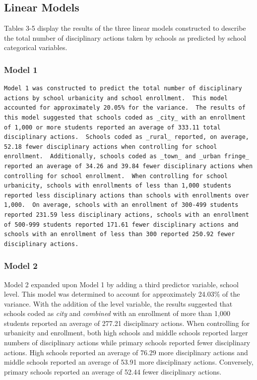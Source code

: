 \documentclass[man]{apa6}
\begin{document}
\hypertarget{linear-models-1}{%
\subsection{Linear Models}\label{linear-models-1}}

Tables 3-5 display the results of the three linear models constructed to describe the total number of disciplinary actions taken by schools as predicted by school categorical variables.

\hypertarget{model-1}{%
\subsubsection{Model 1}\label{model-1}}

\begin{verbatim}
Model 1 was constructed to predict the total number of disciplinary actions by school urbanicity and school enrollment.  This model accounted for approximately 20.05% for the variance.  The results of this model suggested that schools coded as _city_ with an enrollment of 1,000 or more students reported an average of 333.11 total disciplinary actions.  Schools coded as _rural_ reported, on average, 52.18 fewer disciplinary actions when controlling for school enrollment.  Additionally, schools coded as _town_ and _urban fringe_ reported an average of 34.26 and 39.84 fewer disciplinary actions when controlling for school enrollment.  When controlling for school urbanicity, schools with enrollments of less than 1,000 students reported less disciplinary actions than schools with enrollments over 1,000.  On average, schools with an enrollment of 300-499 students reported 231.59 less disciplinary actions, schools with an enrollment of 500-999 students reported 171.61 fewer disciplinary actions and schools with an enrollment of less than 300 reported 250.92 fewer disciplinary actions. 
\end{verbatim}

\hypertarget{model-2}{%
\subsubsection{Model 2}\label{model-2}}

Model 2 expanded upon Model 1 by adding a third predictor variable, school level. This model was determined to account for approximately 24.03\% of the variance. With the addition of the level variable, the results suggested that schools coded as \emph{city} and \emph{combined} with an enrollment of more than 1,000 students reported an average of 277.21 disciplinary actions. When controlling for urbanicity and enrollment, both high schools and middle schools reported larger numbers of disciplinary actions while primary schools reported fewer disciplinary actions. High schools reported an average of 76.29 more disciplinary actions and middle schools reported an average of 53.91 more disciplinary actions. Conversely, primary schools reported an average of 52.44 fewer disciplinary actions.
\end{document}
